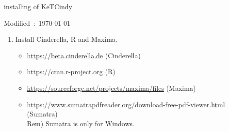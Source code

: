 \documentclass{article}
\begin{document}
\begin{center}
installing of KeTCindy 
\end{center}

\hfill Modified\ :\ \today

\begin{enumerate}[\bf\large 1.]
\item Install Cinderella, R and Maxima.
 \begin{itemize}
 \item \url{https://beta.cinderella.de}  (Cinderella)
 \item \url{https://cran.r-project.org}   (R)
 \item \url{https://sourceforge.net/projects/maxima/files}  (Maxima)
 \item \url{https://www.sumatrapdfreader.org/download-free-pdf-viewer.html} (Sumatra)\\
 \hspace*{10mm}Rem) Sumatra is only for Windows.


\end{itemize}
\end{enumerate}
\end{document}
